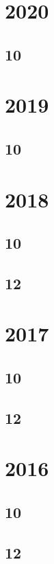 \documentclass[11pt]{book}
\begin{document}
\section{2020}
\subsection{10}

\section{2019}
\subsection{10}

\section{2018}
\subsection{10}


\subsection{12}



\section{2017}
\subsection{10}

\subsection{12}




\section{2016}
\subsection{10}

\subsection{12}

\end{document}

